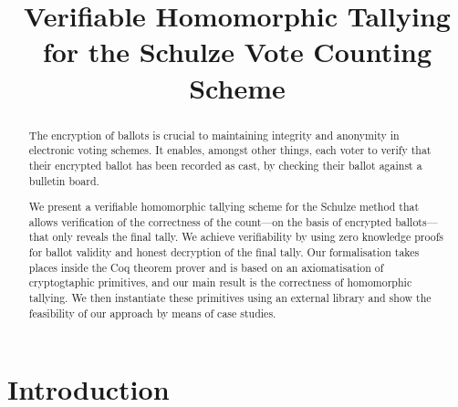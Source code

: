 \documentclass{llncs}
\begin{document}
\title{Verifiable Homomorphic Tallying for the Schulze Vote Counting
Scheme}

\maketitle

\begin{abstract}
The encryption of ballots is crucial to maintaining integrity and 
anonymity in electronic voting schemes. It enables, amongst other 
things, each voter to verify that their encrypted ballot has been 
recorded as cast, by checking their ballot against a bulletin board. 

We present a verifiable homomorphic tallying scheme for the Schulze 
method that allows verification of the correctness of the count---on the 
basis of encrypted ballots---that only reveals the final tally. We 
achieve verifiability by using zero knowledge proofs for ballot 
validity and honest decryption of the final tally. Our formalisation 
takes places inside the Coq theorem prover and is based on an 
axiomatisation of cryptogtaphic primitives, and our main result is 
the correctness of homomorphic tallying. We then instantiate 
these primitives using an external library and show the feasibility 
of our approach by means of case studies.
\end{abstract}


\section{Introduction}
\end{document}
